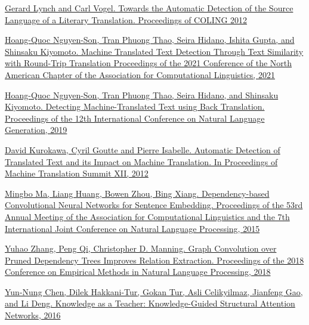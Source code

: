 \documentclass[twocolumn]{article}
\begin{document}

\begin{thebibliography}{99}

   \href{https://aclanthology.org/C12-2076.pdf}{Gerard Lynch and Carl Vogel. Towards the Automatic Detection of the Source Language of a Literary Translation. Proceedings of COLING 2012}

   \href{https://aclanthology.org/2021.naacl-main.462.pdf }{Hoang-Quoc Nguyen-Son, Tran Phuong Thao, Seira Hidano, Ishita Gupta, and Shinsaku Kiyomoto. Machine Translated Text Detection Through Text Similarity with Round-Trip Translation Proceedings of the 2021 Conference of the North American Chapter of the Association for Computational Linguistics, 2021}

   \href{https://arxiv.org/pdf/1910.06558.pdf}{Hoang-Quoc Nguyen-Son, Tran Phuong Thao, Seira Hidano, and Shinsaku Kiyomoto. Detecting Machine-Translated Text using Back Translation. Proceedings of the 12th International Conference on Natural Language Generation, 2019}

   \href{https://www.cs.cmu.edu/~dkurokaw/publications/MTS-2009-Kurokawa.pdf}{David Kurokawa, Cyril Goutte and Pierre Isabelle. Automatic Detection of Translated Text and its Impact on Machine Translation. In Proceedings of Machine Translation Summit XII, 2012}

   \href{https://aclanthology.org/P15-2029.pdf}{Mingbo Ma, Liang Huang, Bowen Zhou, Bing Xiang. Dependency-based Convolutional Neural Networks for Sentence Embedding. Proceedings of the 53rd Annual Meeting of the Association for Computational Linguistics and the 7th International Joint Conference on Natural Language Processing, 2015}

   \href{https://aclanthology.org/D18-1244/}{Yuhao Zhang, Peng Qi, Christopher D. Manning. Graph Convolution over Pruned Dependency Trees Improves Relation Extraction. Proceedings of the 2018 Conference on Empirical Methods in Natural Language Processing, 2018}

   \href{https://arxiv.org/pdf/1609.03286.pdf
}{Yun-Nung Chen, Dilek Hakkani-Tur, Gokan Tur, Asli Celikyilmaz, Jianfeng Gao, and Li Deng. Knowledge as a Teacher: Knowledge-Guided Structural Attention Networks, 2016}

\end{thebibliography}
\end{document}
